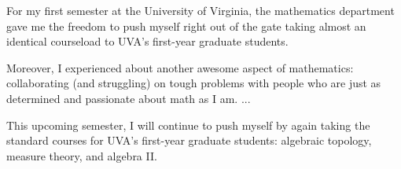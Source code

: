 \documentclass[12pt]{article}
\begin{document}

For my first semester at the University of Virginia, the mathematics department gave me the freedom to push myself right out of the gate taking almost an identical courseload to UVA's first-year graduate students.




Moreover, I experienced about another awesome aspect of mathematics: collaborating (and struggling) on tough problems with people who are just as determined and passionate about math as I am. ...

This upcoming semester, I will continue to push myself by again taking the standard courses for UVA's first-year graduate students: algebraic topology, measure theory, and algebra II.
\\




\end{document}
